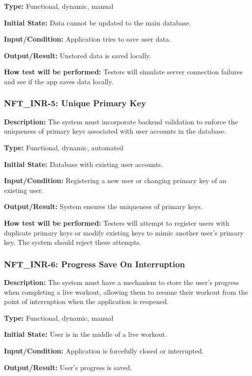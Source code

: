 \documentclass[12pt, titlepage]{article}
\begin{document}
\textbf{Type:} Functional, dynamic, manual

\textbf{Initial State:} Data cannot be updated to the main database.

\textbf{Input/Condition: }Application tries to save user data.

\textbf{Output/Result: }Unstored data is saved locally.

\textbf{How test will be performed:} Testers will simulate server connection failures and see if the app saves data locally.


\subsubsection*{\textbf{NFT\_INR-5: Unique Primary Key}
}

\textbf{Description: }The system must incorporate backend validation to enforce the uniqueness of primary keys associated with user accounts in the database. 

\textbf{Type: }Functional, dynamic, automated

\textbf{Initial State:} Database with existing user accounts.

\textbf{Input/Condition:} Registering a new user or changing primary key of an existing user.

\textbf{Output/Result:} System ensures the uniqueness of primary keys.

\textbf{How test will be performed:} Testers will attempt to register users with duplicate primary keys or modify existing keys to mimic another user's primary key. The system should reject these attempts.


\subsubsection*{\textbf{NFT\_INR-6: Progress Save On Interruption}
}

\textbf{Description: }The system must have a mechanism to store the user’s progress when completing a live workout, allowing them to resume their workout from the point of interruption when the application is reopened.

\textbf{Type: }Functional, dynamic, manual

\textbf{Initial State:} User is in the middle of a live workout.

\textbf{Input/Condition:} Application is forcefully closed or interrupted.

\textbf{Output/Result: }User's progress is saved.
\end{document}
